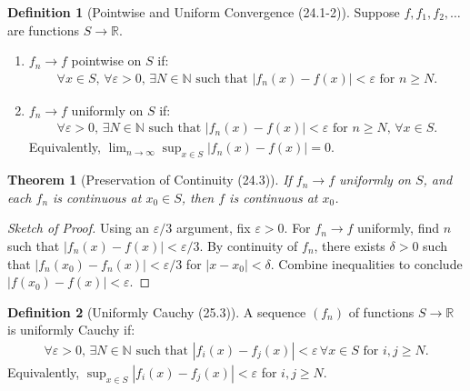 \documentclass[7pt]{article}
\theoremstyle{definition}
\newtheorem{definition}{Definition}
\theoremstyle{plain}
\newtheorem{theorem}{Theorem}
\begin{document}
\begin{definition}[Pointwise and Uniform Convergence (24.1-2)]
Suppose $ f, f_1, f_2, \ldots $ are functions $ S \to \mathbb{R} $.
\begin{enumerate}
    \item $ f_n \to f $ pointwise on $ S $ if:
    \begin{align}
    \forall x \in S, \, \forall \varepsilon > 0, \, \exists N \in \mathbb{N} \text{ such that } |f_n(x) - f(x)| < \varepsilon \text{ for } n \geq N.
    \end{align}
    \item $ f_n \to f $ uniformly on $ S $ if:
    \begin{align}
    \forall \varepsilon > 0, \, \exists N \in \mathbb{N} \text{ such that } |f_n(x) - f(x)| < \varepsilon \text{ for } n \geq N, \, \forall x \in S.
    \end{align}
    Equivalently, $ \lim_{n \to \infty} \sup_{x \in S} |f_n(x) - f(x)| = 0 $.
\end{enumerate}
\end{definition}

\begin{theorem}[Preservation of Continuity (24.3)]
If $ f_n \to f $ uniformly on $ S $, and each $ f_n $ is continuous at $ x_0 \in S $, then $ f $ is continuous at $ x_0 $.
\end{theorem}

\begin{proof}[Sketch of Proof]
Using an $ \varepsilon/3 $ argument, fix $ \varepsilon > 0 $. For $ f_n \to f $ uniformly, find $ n $ such that $ |f_n(x) - f(x)| < \varepsilon/3 $. By continuity of $ f_n $, there exists $ \delta > 0 $ such that $ |f_n(x_0) - f_n(x)| < \varepsilon/3 $ for $ |x - x_0| < \delta $. Combine inequalities to conclude $ |f(x_0) - f(x)| < \varepsilon $.
\end{proof}

\begin{definition}[Uniformly Cauchy (25.3)]
A sequence $ (f_n) $ of functions $ S \to \mathbb{R} $ is uniformly Cauchy if:
\begin{align}
\forall \varepsilon > 0, \, \exists N \in \mathbb{N} \text{ such that } |f_i(x) - f_j(x)| < \varepsilon \, \forall x \in S \text{ for } i, j \geq N.
\end{align}
Equivalently, $ \sup_{x \in S} |f_i(x) - f_j(x)| < \varepsilon $ for $ i, j \geq N $.
\end{definition}
\end{document}

